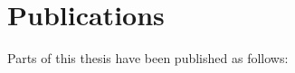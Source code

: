 

\chapter*{Publications} %

Parts of this thesis have been published as follows:\\
\sloppy
\begin{refsection} %
\nocite{nedelkoski2019hugo, nedelkoski2019anomalymultimodal, nedelkoski2019anomaly,nedelkoski2019edge,nedelkoski2019distributions, nedelkoski2020data, nedelkoski2020loganomaly, nedelkoski2020selfsupervised, nedelkoski2020joint, nedelkoski2020selftracing} %
\printbibliography[heading=none] %
\end{refsection}

